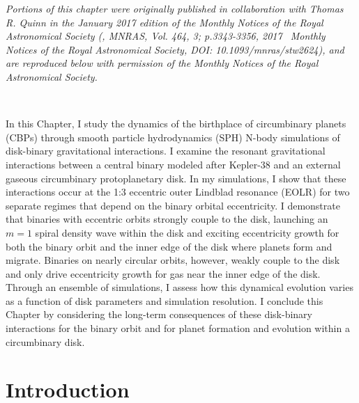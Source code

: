 \textit{Portions of this chapter were originally published in collaboration with Thomas R. Quinn in the January 2017 edition of the Monthly Notices of the Royal Astronomical Society (\citet{Fleming2017}, MNRAS, Vol. 464, 3; p.3343-3356, 2017 \textcopyright \ Monthly Notices of the Royal Astronomical Society, DOI: 10.1093/mnras/stw2624), and are reproduced below with permission of the Monthly Notices of the Royal Astronomical Society.}

\

In this Chapter, I study the dynamics of the birthplace of circumbinary planets (CBPs) through smooth particle hydrodynamics (SPH) N-body simulations of disk-binary gravitational interactions. I examine the resonant gravitational interactions between a central binary modeled after Kepler-38 and an external gaseous circumbinary protoplanetary disk. In my simulations, I show that these interactions occur at the 1:3 eccentric outer Lindblad resonance (EOLR) for two separate regimes that depend on the binary orbital eccentricity. I demonstrate that binaries with eccentric orbits strongly couple to the disk, launching an $m=1$ spiral density wave within the disk and exciting eccentricity growth for both the binary orbit and the inner edge of the disk where planets form and migrate. Binaries on nearly circular orbits, however, weakly couple to the disk and only drive eccentricity growth for gas near the inner edge of the disk. Through an ensemble of simulations, I assess how this dynamical evolution varies as a function of disk parameters and simulation resolution. I conclude this Chapter by considering the long-term consequences of these disk-binary interactions for the binary orbit and for planet formation and evolution within a circumbinary disk.

\section{Introduction}

